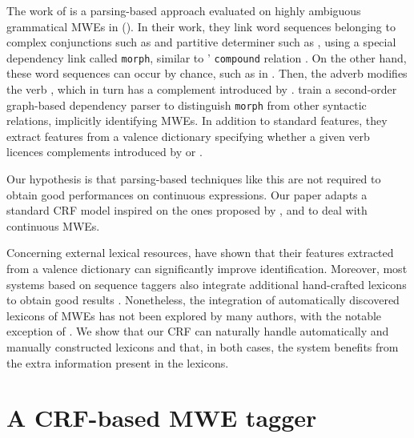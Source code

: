 \documentclass[output=paper,modfonts]{langscibook}
\begin{document}
The work of \citet{nasr:acl:2015} is a parsing-based approach evaluated on highly ambiguous grammatical MWEs in  (). In their work, they link word sequences belonging to complex conjunctions such as  and partitive determiner such as , using a special dependency link called \texttt{morph}, similar to ' \texttt{compound} relation \citep{univdep}. On the other hand, these word sequences can occur by chance, such as in . Then, the adverb  modifies the verb , which in turn has a complement introduced by . \citet{nasr:acl:2015} train a second-order graph-based dependency parser to distinguish \texttt{morph} from other syntactic relations, implicitly identifying MWEs. In addition to standard features, they extract features from a valence dictionary specifying whether a given verb licences complements introduced by  or .

Our hypothesis is that parsing-based techniques like this are not required to obtain good performances on continuous expressions. Our paper adapts a standard CRF model inspired on the ones proposed by \citet{constant-sigogne:2011:MWE}, \citet{riedl-biemann:2016:MWE} and \citet{shigeto-EtAl:2013:MWE} to deal with continuous MWEs. 

Concerning external lexical resources, \citet{nasr:acl:2015} have shown that their features extracted from a valence dictionary can significantly improve identification. Moreover, most systems based on sequence taggers also integrate additional hand-crafted lexicons to obtain good results \citep{constant-sigogne:2011:MWE,Schneider14b}. Nonetheless, the integration of automatically discovered lexicons of MWEs has not been explored by many authors, with the notable exception of  \citet{riedl-biemann:2016:MWE}. We show that our CRF can naturally handle automatically and manually constructed lexicons and that, in both cases, the system benefits from the extra information present in the lexicons.

\section{A CRF-based MWE tagger}
\label{schol:sec:crf}
\end{document}
